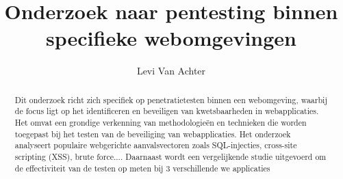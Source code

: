 \documentclass[a0,portrait]{hogent-poster}
\title{Onderzoek naar pentesting binnen specifieke webomgevingen}
\author{Levi Van Achter}
\begin{document}
\maketitle

\begin{abstract}
  Dit onderzoek richt zich specifiek op penetratietesten binnen een webomgeving, waarbij de focus ligt op het
  identificeren en beveiligen van kwetsbaarheden in webapplicaties. Het omvat een grondige verkenning van
  methodologieën en technieken die worden toegepast bij het testen van de beveiliging van webapplicaties. Het
  onderzoek analyseert populaire webgerichte aanvalsvectoren zoals SQL-injecties, cross-site scripting (XSS),
  brute force.... Daarnaast wordt een vergelijkende studie uitgevoerd om de effectiviteit van
  de testen op meten bij 3 verschillende we applicaties
\end{abstract}
\end{document}
